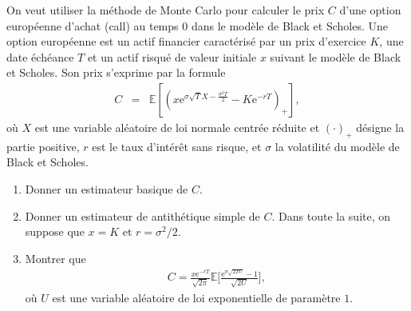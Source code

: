 \documentclass[11pt]{td_um}
\begin{document}
\begin{exo}{} %
    On veut utiliser la m\'ethode de Monte Carlo pour calculer le prix $C$ d'une option européenne d'achat (call) au temps 0 dans le mod\`ele de Black et Scholes. Une option européenne est un actif financier caractérisé par un prix d'exercice $K$, une date échéance $T$ et un actif risqué de valeur initiale $x$ suivant le mod\`ele de Black et Scholes. Son prix s'exprime par la formule
    \begin{eqnarray*}
        C&=&\mathbb{E}\left[\left(x\mathrm{e}^{\sigma\sqrt{T}X-\frac{\sigma^2T}{2}}-K\mathrm{e}^{-rT}\right)_+\right],
    \end{eqnarray*}
    où $X$ est une variable al\'eatoire de loi normale centr\'ee r\'eduite et $(\cdot)_+$ désigne la partie positive,
    $r$ est le taux d'intérêt sans risque, et $\sigma$ la volatilité du modèle de Black et Scholes.
    \begin{enumerate}
        \item Donner un estimateur basique de $C$.
        \item Donner un estimateur de antithétique simple de $C$.
            Dans toute la suite, on suppose que $x=K$ et $r=\sigma^2/2$.
        \item  Montrer que
            \begin{align*}
                C=\frac{x\mathrm{e}^{-rT}}{\sqrt{2\pi}}\mathbb{E}\Big[\frac{\mathrm{e}^{\sigma\sqrt{2TU}}-1}{\sqrt{2U}}\Big],
            \end{align*}
            o\`u $U$ est une variable al\'eatoire de loi exponentielle de param\`etre $1$.


\end{enumerate}
\end{exo}
\end{document}
